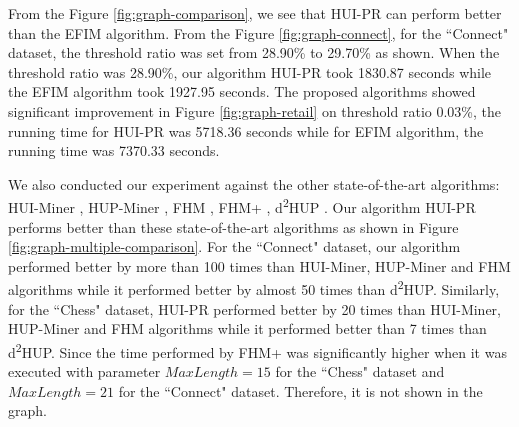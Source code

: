 \documentclass[11pt,openright]{report}
\begin{document}
From the Figure \ref{fig:graph-comparison}, we see that HUI-PR can perform better than the EFIM algorithm. From the Figure \ref{fig:graph-connect}, for the ``Connect" dataset, the threshold ratio was set from 28.90\% to 29.70\% as shown. When the threshold ratio was 28.90\%, our algorithm HUI-PR took 1830.87 seconds while the EFIM algorithm took 1927.95 seconds. The proposed algorithms showed significant improvement in Figure \ref{fig:graph-retail} on threshold ratio 0.03\%, the running time for HUI-PR was 5718.36 seconds while for EFIM algorithm, the running time was 7370.33 seconds.

We also conducted our experiment against the other state-of-the-art algorithms: HUI-Miner \cite{Liu2012}, HUP-Miner \cite{Krishnamoorthy2015}, FHM \cite{Fournier-Viger2014}, FHM+ \cite{Fournier-Viger2016}, d\textsuperscript{2}HUP \cite{Krishnamoorthy2015, Liu2012}. Our algorithm HUI-PR performs better than these state-of-the-art algorithms as shown in Figure \ref{fig:graph-multiple-comparison}. For the ``Connect" dataset, our algorithm performed better by more than 100 times than HUI-Miner, HUP-Miner and FHM algorithms while it performed better by almost 50 times than d\textsuperscript{2}HUP. Similarly, for the ``Chess" dataset, HUI-PR performed better by 20 times than HUI-Miner, HUP-Miner and FHM algorithms while it performed better than 7 times than d\textsuperscript{2}HUP. Since the time performed by FHM+ was significantly higher when it was executed with parameter $MaxLength=15$ for the ``Chess" dataset and $MaxLength=21$ for the ``Connect" dataset. Therefore, it is not shown in the graph.
\end{document}
